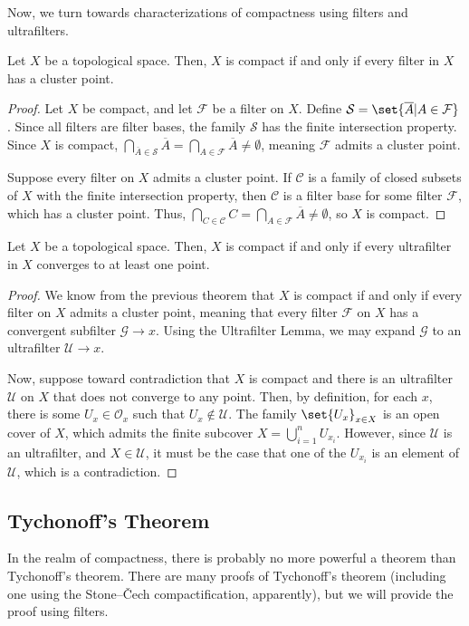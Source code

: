 \documentclass[10pt]{mypackage}
\begin{document}
  Now, we turn towards characterizations of compactness using filters and ultrafilters.
  \begin{theorem}
    Let $X$ be a topological space. Then, $X$ is compact if and only if every filter in $X$ has a cluster point.
  \end{theorem}
  \begin{proof}
    Let $X$ be compact, and let $\mathcal{F}$ be a filter on $X$. Define $\mathcal{S} = \set{ \overline{A} | A\in \mathcal{F} }$. Since all filters are filter bases, the family $ \mathcal{S} $ has the finite intersection property. Since $X$ is compact, $\bigcap_{ \overline{A}\in \mathcal{S} } \overline{A} = \bigcap_{A\in \mathcal{F}} \overline{A} \neq \emptyset$, meaning $\mathcal{F}$ admits a cluster point.\newline

    Suppose every filter on $X$ admits a cluster point. If $\mathcal{C}$ is a family of closed subsets of $X$ with the finite intersection property, then $\mathcal{C}$ is a filter base for some filter $\mathcal{F}$, which has a cluster point. Thus, $\bigcap_{C\in \mathcal{C}} C = \bigcap_{A\in \mathcal{F}} \overline{A} \neq \emptyset$, so $X$ is compact.
  \end{proof}
  \begin{theorem}
    Let $X$ be a topological space. Then, $X$ is compact if and only if every ultrafilter in $X$ converges to at least one point.
  \end{theorem}
  \begin{proof}
    We know from the previous theorem that $X$ is compact if and only if every filter on $X$ admits a cluster point, meaning that every filter $\mathcal{F}$ on $X$ has a convergent subfilter $\mathcal{G}\rightarrow x$. Using the Ultrafilter Lemma, we may expand $\mathcal{G}$ to an ultrafilter $\mathcal{U}\rightarrow x$.\newline

    Now, suppose toward contradiction that $X$ is compact and there is an ultrafilter $\mathcal{U}$ on $X$ that does not converge to any point. Then, by definition, for each $x$, there is some $U_x\in \mathcal{O}_x$ such that $U_x\notin \mathcal{U}$. The family $\set{U_x}_{x\in X}$ is an open cover of $X$, which admits the finite subcover $X = \bigcup_{i=1}^{n}U_{x_i}$. However, since $\mathcal{U}$ is an ultrafilter, and $X\in \mathcal{U}$, it must be the case that one of the $U_{x_i}$ is an element of $\mathcal{U}$, which is a contradiction.
  \end{proof}
\subsection{Tychonoff's Theorem}%
In the realm of compactness, there is probably no more powerful a theorem than Tychonoff's theorem. There are many proofs of Tychonoff's theorem (including one using the Stone--\v{C}ech compactification, apparently), but we will provide the proof using filters.\newline
\end{document}
